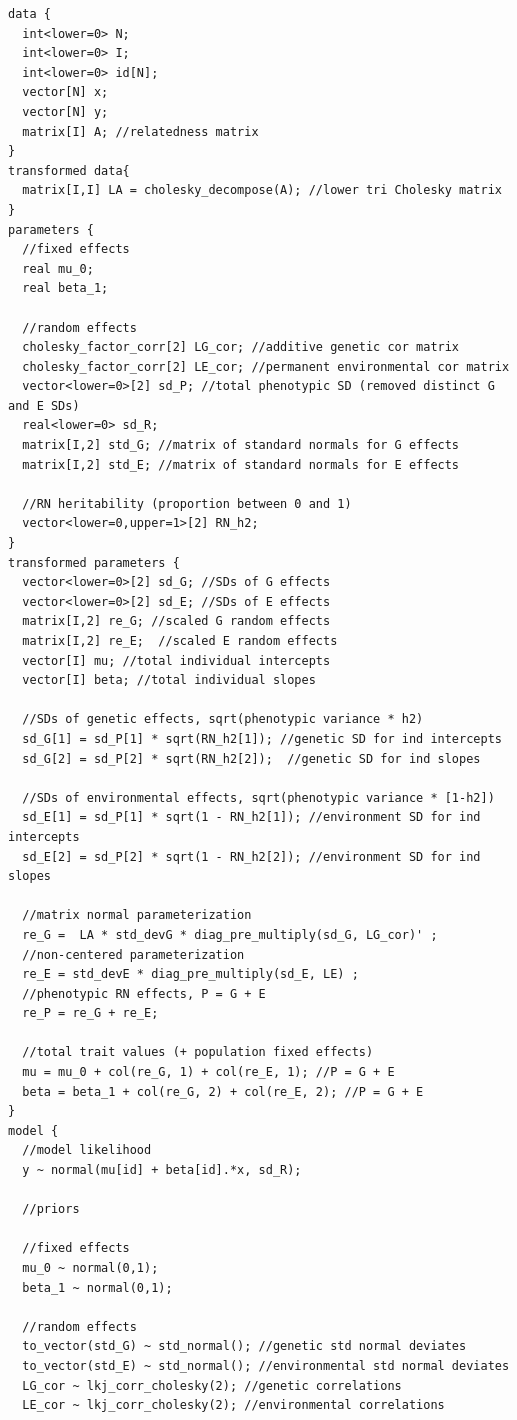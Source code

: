 \documentclass[
]{book}
\begin{document}
\begin{verbatim}
data {
  int<lower=0> N; 
  int<lower=0> I; 
  int<lower=0> id[N]; 
  vector[N] x; 
  vector[N] y;
  matrix[I] A; //relatedness matrix
}
transformed data{
  matrix[I,I] LA = cholesky_decompose(A); //lower tri Cholesky matrix 
}
parameters {
  //fixed effects
  real mu_0;
  real beta_1;
  
  //random effects
  cholesky_factor_corr[2] LG_cor; //additive genetic cor matrix
  cholesky_factor_corr[2] LE_cor; //permanent environmental cor matrix
  vector<lower=0>[2] sd_P; //total phenotypic SD (removed distinct G and E SDs)
  real<lower=0> sd_R;
  matrix[I,2] std_G; //matrix of standard normals for G effects
  matrix[I,2] std_E; //matrix of standard normals for E effects
  
  //RN heritability (proportion between 0 and 1)
  vector<lower=0,upper=1>[2] RN_h2;
}
transformed parameters {
  vector<lower=0>[2] sd_G; //SDs of G effects
  vector<lower=0>[2] sd_E; //SDs of E effects
  matrix[I,2] re_G; //scaled G random effects
  matrix[I,2] re_E;  //scaled E random effects
  vector[I] mu; //total individual intercepts
  vector[I] beta; //total individual slopes
  
  //SDs of genetic effects, sqrt(phenotypic variance * h2)
  sd_G[1] = sd_P[1] * sqrt(RN_h2[1]); //genetic SD for ind intercepts 
  sd_G[2] = sd_P[2] * sqrt(RN_h2[2]);  //genetic SD for ind slopes
  
  //SDs of environmental effects, sqrt(phenotypic variance * [1-h2])
  sd_E[1] = sd_P[1] * sqrt(1 - RN_h2[1]); //environment SD for ind intercepts 
  sd_E[2] = sd_P[2] * sqrt(1 - RN_h2[2]); //environment SD for ind slopes 
  
  //matrix normal parameterization
  re_G =  LA * std_devG * diag_pre_multiply(sd_G, LG_cor)' ; 
  //non-centered parameterization
  re_E = std_devE * diag_pre_multiply(sd_E, LE) ;
  //phenotypic RN effects, P = G + E
  re_P = re_G + re_E;
  
  //total trait values (+ population fixed effects)
  mu = mu_0 + col(re_G, 1) + col(re_E, 1); //P = G + E
  beta = beta_1 + col(re_G, 2) + col(re_E, 2); //P = G + E
}
model {
  //model likelihood
  y ~ normal(mu[id] + beta[id].*x, sd_R);

  //priors
  
  //fixed effects
  mu_0 ~ normal(0,1);
  beta_1 ~ normal(0,1);

  //random effects
  to_vector(std_G) ~ std_normal(); //genetic std normal deviates
  to_vector(std_E) ~ std_normal(); //environmental std normal deviates
  LG_cor ~ lkj_corr_cholesky(2); //genetic correlations
  LE_cor ~ lkj_corr_cholesky(2); //environmental correlations
  

\end{verbatim}
\end{document}
